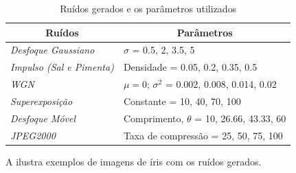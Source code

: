 \begin{table}[h!]
\centering
\caption{Ruídos gerados e os parâmetros utilizados}
\label{tab:experimentos:ruidos}
\begin{tabular}{|l|l|}
\hline
\multicolumn{1}{|c|}{\textbf{Ruídos}} & \multicolumn{1}{c|}{\textbf{Parâmetros}} \\ \hline
\textit{Desfoque Gaussiano} & {}$\sigma$ = 0.5, 2, 3.5, 5 {} \\ \hline
\textit{Impulso (Sal e Pimenta)} & {}Densidade = 0.05, 0.2, 0.35, 0.5 {} \\ \hline
\textit{\acrshort{WGN}} & {}$\mu = 0$; $\sigma^2$ = 0.002, 0.008, 0.014, 0.02{} \\ \hline
\textit{Superexposição} & {}Constante = 10, 40, 70, 100 {} \\ \hline
\textit{Desfoque Móvel} & {}Comprimento, $\theta$ = 10, 26.66, 43.33, 60{} \\ \hline
\textit{JPEG2000} & {}Taxa de compressão = 25, 50, 75, 100{} \\ \hline
\end{tabular}
\end{table}

\par A  ilustra exemplos de imagens de íris com os ruídos gerados.

